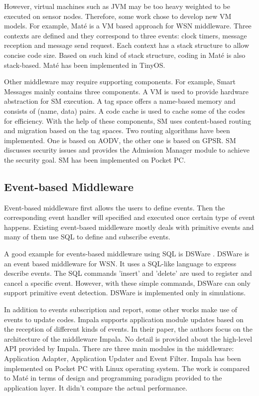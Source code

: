However, virtual machines such as JVM may be too heavy weighted to be executed on sensor nodes. Therefore, some work chose to develop new VM models. For example, Mat\'{e} \cite{mate} is a VM based approach for WSN middleware. Three contexts are defined and they correspond to three events: clock timers, message reception and message send request. Each context has a stack structure to allow concise code size. Based on such kind of stack structure, coding in Mat\'{e} is also stack-based. Mat\'{e} has been implemented in TinyOS.

Other middleware may require supporting components. For example, Smart Messages \cite{smartmessage} mainly contains three components. A VM is used to provide hardware abstraction for SM execution. A tag space offers a name-based memory and consists of (name, data) pairs. A code cache is used to cache some of the codes for efficiency. With the help of these components, SM uses content-based routing and migration based on the tag spaces. Two routing algorithms have been implemented. One is based on AODV, the other one is based on GPSR. SM discusses security issues and provides the Admission Manager module to achieve the security goal. SM has been implemented on Pocket PC.

\subsection{Event-based Middleware}
Event-based middleware first allows the users to define events. Then the corresponding event handler will specified and executed once certain type of event happens. Existing event-based middleware mostly deals with primitive events and many of them use SQL to define and subscribe events. 

A good example for events-based middleware using SQL is DSWare \cite{dsware}. DSWare is an event based middleware for WSN. It uses a SQL-like language to express describe events. The SQL commands 'insert' and 'delete' are used to register and cancel a specific event. However, with these simple commands, DSWare can only support primitive event detection. DSWare is implemented only in simulations.

In addition to events subscription and report, some other works make use of events to update codes. Impala \cite{impala} supports application module updates based on the reception of different kinds of events. In their paper, the authors focus on the architecture of the middleware Impala. No detail is provided about the high-level API provided by Impala. There are three main modules in the middleware: Application Adapter, Application Updater and Event Filter. Impala has been implemented on Pocket PC with Linux operating system. The work is compared to Mat\'{e} in terms of design and programming paradigm provided to the application layer. It didn't compare the actual performance.

